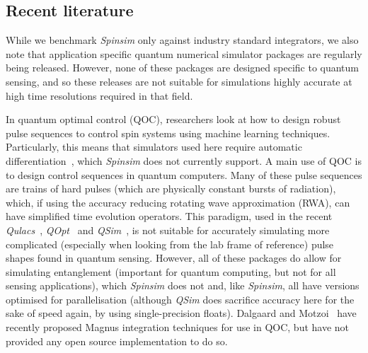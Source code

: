 \documentclass{jors}
\begin{document}

	

	\subsection{Recent literature}
		While we benchmark \emph{Spinsim} only against industry standard integrators, we also note that application specific quantum numerical simulator packages are regularly being released.
		However, none of these packages are designed specific to quantum sensing, and so these releases are not suitable for simulations highly accurate at high time resolutions required in that field.

		In quantum optimal control (QOC), researchers look at how to design robust pulse sequences to control spin systems using machine learning techniques.
		Particularly, this means that simulators used here require automatic differentiation~\cite{griewank_who_2012}, which \emph{Spinsim} does not currently support.
		A main use of QOC is to design control sequences in quantum computers.
		Many of these pulse sequences are trains of hard pulses (which are physically constant bursts of radiation), which, if using the accuracy reducing rotating wave approximation (RWA), can have simplified time evolution operators.
		This paradigm, used in the recent \emph{Qulacs}~\cite{suzuki_qulacs_2021}, \emph{QOpt}~\cite{teske_qopt_2021} and \emph{QSim}~\cite{isakov_simulations_2021}, is not suitable for accurately simulating more complicated (especially when looking from the lab frame of reference) pulse shapes found in quantum sensing.
		However, all of these packages do allow for simulating entanglement (important for quantum computing, but not for all sensing applications), which \emph{Spinsim} does not and, like \emph{Spinsim}, all have versions optimised for parallelisation (although \emph{QSim} does sacrifice accuracy here for the sake of speed again, by using single-precision floats).
		Dalgaard and Motzoi~\cite{dalgaard_fast_2021} have recently proposed Magnus integration techniques for use in QOC, but have not provided any open source implementation to do so.

\end{document}

